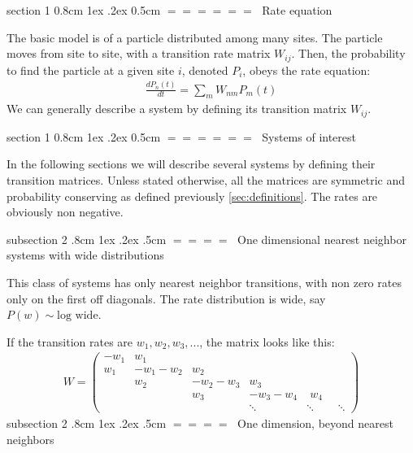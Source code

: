 \documentclass[onecolumn,fleqn,notitlepage,secnumarabic]{revtex4}
\makeatletter
\def\section{%
  \@startsection
    {section}%
    {1}%
    {\z@}%
    {0.8cm \@plus1ex \@minus .2ex}%
    {0.5cm}%
    {\Large\bf $=\!=\!=\!=\!=\!=\;$}%
}%
\def\subsection{%
  \@startsection
    {subsection}%
    {2}%
    {\z@}%
    {.8cm \@plus1ex \@minus .2ex}%
    {.5cm}%
    {\normalfont\small\bfseries$=\!=\!=\!=\;$}%
}%
\makeatother
\begin{document}
\section{Rate equation}

The basic model is of a particle distributed among many sites. The particle moves from site to site, with a transition rate matrix $W_{ij}$. Then, the probability to find the particle at a given site $i$, denoted $P_i$, obeys the rate equation:
\begin{align}
\frac{dP_n(t)}{dt} = \sum_m W_{nm}P_m(t)
\end{align}
We can generally describe a system by defining its transition matrix $W_{ij}$.

\section{Systems of interest}\label{sec:sys_of_interest}

In the following sections we will describe several systems by defining their transition matrices. Unless stated otherwise, all the matrices are symmetric and probability conserving as defined previously \ref{sec:definitions}. The rates are obviously non negative.

\subsection{One dimensional nearest neighbor systems with wide distributions}

This class of systems has only nearest neighbor transitions, with non zero rates only on the first off diagonals. The rate distribution is wide, say $P(w) \sim \textrm{log wide}$.


If the transition rates are $w_1,w_2,w_3,...$, the matrix looks like this:
\begin{align}
W = 
\begin{pmatrix}
-w_1  & w_1 \\
w_1  & -w_1-w_2 &  w_2 \\
 & w_2 & -w_2-w_3 &  w_3 \\
& & w_3 & -w_3-w_4 & \; w_4 \\
& & & \ddots &\ddots&\;\;\ddots
\end{pmatrix}
\end{align}
\subsection{One dimension, beyond nearest neighbors}
\end{document}
